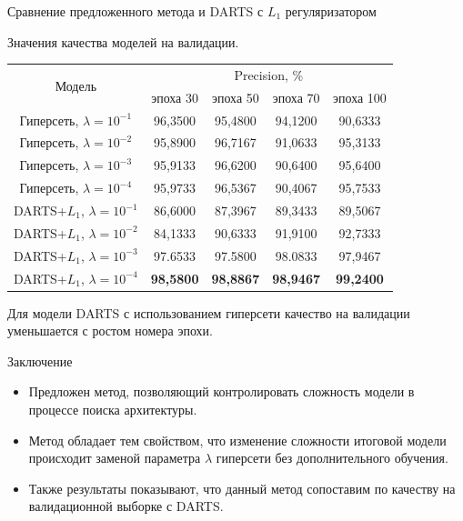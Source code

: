 \documentclass{beamer}
\begin{document}
\begin{frame}{Сравнение предложенного метода и DARTS с $L_1$ регуляризатором}
\begin{center}
Значения качества моделей на валидации.
\begin{table}[H]
	\begin{tabular}{ |c|c|c|c|c| }
	\hline
	 \multirow{2}{*}{Модель} & \multicolumn{4}{c|}{Precision, \%} \\ \cline{2-5}
	 		& эпоха 30 & эпоха 50 & эпоха 70 & эпоха 100\\
	 \hline
 	Гиперсеть, $\lambda = 10^{-1}$ &96,3500 & 95,4800 & 94,1200 & 90,6333  \\ 
 	Гиперсеть, $\lambda = 10^{-2}$ &95,8900 & 96,7167& 91,0633 & 95,3133 \\ 
 	Гиперсеть, $\lambda = 10^{-3}$ &95,9133 & 96,6200 & 90,6400 & 95,6400 \\ 
 	Гиперсеть, $\lambda = 10^{-4}$ &95,9733 & 96,5367 & 90,4067 & 95,7533\\
 	\hline
 	DARTS+$L_1$, $\lambda = 10^{-1}$ &86,6000 &87,3967 & 89,3433 & 89,5067 \\
 	DARTS+$L_1$, $\lambda = 10^{-2}$ & 84,1333 & 90,6333 &91,9100 & 92,7333\\
 	DARTS+$L_1$, $\lambda = 10^{-3}$ &97.6533 & 97.5800 & 98.0833 & 97,9467 \\
 	DARTS+$L_1$, $\lambda = 10^{-4}$ & \textbf{98,5800} &  \textbf{98,8867}&\textbf{98,9467}&\textbf{99,2400} \\
 	\hline
\end{tabular}
\end{table}
\end{center}

Для модели DARTS с использованием гиперсети качество на валидации уменьшается с ростом номера эпохи.

\end{frame}
\begin{frame}{Заключение}
    \begin{itemize}
        \item Предложен метод, позволяющий контролировать сложность модели в процессе поиска архитектуры.
        \item Метод обладает тем свойством, что изменение сложности итоговой модели происходит заменой параметра $\lambda$ гиперсети без дополнительного обучения.
        \item Также результаты показывают, что данный метод сопоставим по качеству на валидационной выборке с DARTS.
    \end{itemize}
\end{frame}
\end{document}
